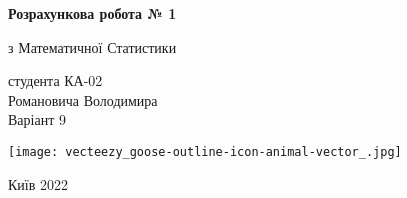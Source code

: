 \documentclass[11 pt]{article}
\begin{document}
\begin{titlepage}
    \begin{center}
        \vspace*{1cm}
            
        \Huge
        \textbf{Розрахункова робота № 1}
            
        \vspace{0.5cm}
        \LARGE
        з Математичної Статистики
            
        \vspace{1.5cm}
            
            
        \vfill
        студента КА-02\\
        Романовича Володимира \\ 
        Варіант 9
        \vspace{0.8cm}
            
        \texttt{[image: vecteezy\_goose-outline-icon-animal-vector\_.jpg]}
            
        \Large
        Київ 2022
            
    \end{center}
\end{titlepage}
\end{document}

